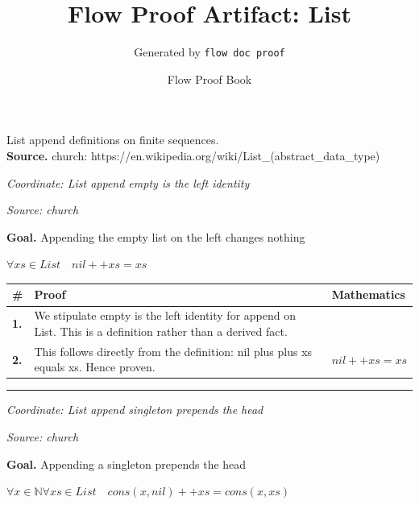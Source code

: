 \documentclass[11pt]{article}
\title{Flow Proof Artifact: List}
\author{Generated by \texttt{flow doc proof}}
\date{Flow Proof Book}
\theoremstyle{definition}
\begin{document}
\maketitle
List append definitions on finite sequences.\\[0.5em]
\textbf{Source.} church: https://en.wikipedia.org/wiki/List\_(abstract\_data\_type)\\[0.5em]
\bigskip
{}\par
\smallskip\noindent\textit{Coordinate: List \cdot append \cdot empty is the left identity}\par
\smallskip\noindent\textit{Source: church}\par
\medskip
\noindent\textbf{Goal.} Appending the empty list on the left changes nothing\par
\noindent$\displaystyle \forall xs \in List\quad nil ++ xs = xs$\par
\medskip
\noindent
\begin{tabular}{@{} >{\raggedright\arraybackslash}p{} >{\raggedright\arraybackslash}p{} >{\raggedleft\arraybackslash}p{} @{}}
\textbf{\#} & \textbf{Proof} & \textbf{Mathematics} \\
\midrule
\textbf{1.} & We stipulate empty is the left identity for append on List. This is a definition rather than a derived fact. & \\[0.45em]
\textbf{2.} & This follows directly from the definition: nil plus plus xs equals xs. Hence proven. & $\displaystyle nil ++ xs = xs$ \\[0.45em]
\bottomrule
\end{tabular}
\label{thm:List-append-empty_is_the_left_identity}
\par\medskip\hrule
\bigskip
{}\par
\smallskip\noindent\textit{Coordinate: List \cdot append \cdot singleton prepends the head}\par
\smallskip\noindent\textit{Source: church}\par
\medskip
\noindent\textbf{Goal.} Appending a singleton prepends the head\par
\noindent$\displaystyle \forall x \in \mathbb{N} \forall xs \in List\quad cons(x, nil) ++ xs = cons(x, xs)$\par
\end{document}
